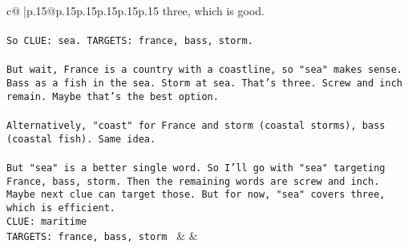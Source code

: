 \documentclass{article}
\begin{document}
{\begin{supertabular}{c@{$\;$}|p{.15\linewidth}@{}p{.15\linewidth}p{.15\linewidth}p{.15\linewidth}p{.15\linewidth}p{.15\linewidth}}
{{{three, which is good.\\ \tt \\ \tt So CLUE: sea. TARGETS: france, bass, storm.\\ \tt \\ \tt But wait, France is a country with a coastline, so "sea" makes sense. Bass as a fish in the sea. Storm at sea. That's three. Screw and inch remain. Maybe that's the best option.\\ \tt \\ \tt Alternatively, "coast" for France and storm (coastal storms), bass (coastal fish). Same idea.\\ \tt \\ \tt But "sea" is a better single word. So I'll go with "sea" targeting France, bass, storm. Then the remaining words are screw and inch. Maybe next clue can target those. But for now, "sea" covers three, which is efficient.\\ \tt CLUE: maritime\\ \tt TARGETS: france, bass, storm 
	  } 
	   } 
	   } 
	 & & \\ 
 

    \theutterance {}  


\end{supertabular}}
\end{document}

